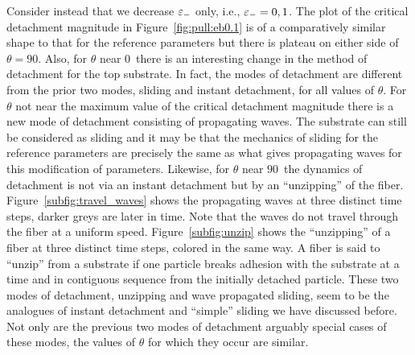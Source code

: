 Consider instead that we decrease $\varepsilon_-$ only, i.e., $\varepsilon_-=0,1$. The plot of the critical detachment magnitude in Figure~\ref{fig:pull:eb0.1} is of a comparatively similar shape to that for the reference parameters but there is plateau on either side of $\theta=90$\textdegree. Also, for $\theta$ near $0$\textdegree\ there is an interesting change in the method of detachment for the top substrate. In fact, the modes of detachment are different from the prior two modes, sliding and instant detachment, for all values of $\theta$. For $\theta$ not near the maximum value of the critical detachment magnitude there is a new mode of detachment consisting of propagating waves. The substrate can still be considered as sliding and it may be that the mechanics of sliding for the reference parameters are precisely the same as what gives propagating waves for this modification of parameters. Likewise, for $\theta$ near $90$\textdegree\ the dynamics of detachment is not via an instant detachment but by an ``unzipping'' of the fiber. Figure~\ref{subfig:travel_waves} shows the propagating waves at three distinct time steps, darker greys are later in time. Note that the waves do not travel through the fiber at a uniform speed. Figure~\ref{subfig:unzip} shows the ``unzipping'' of a fiber at three distinct time steps, colored in the same way. A fiber is said to ``unzip'' from a substrate if one particle breaks adhesion with the substrate at a time and in contiguous sequence from the initially detached particle. These two modes of detachment, unzipping and wave propagated sliding, seem to be the analogues of instant detachment and ``simple'' sliding we have discussed before. Not only are the previous two modes of detachment arguably special cases of these modes, the values of $\theta$ for which they occur are similar.


